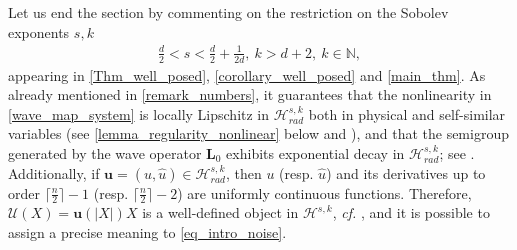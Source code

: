 \documentclass[12pt,reqno]{amsart}
\theoremstyle{plain}
\theoremstyle{remark}
\theoremstyle{plain}
\theoremstyle{definition}
\numberwithin{equation}{section}
\numberwithin{equation}{section}
\def\N{{\mathbb N}}
\newcommand{\HH}{\mathcal{H}}
\begin{document}
	Let us end the section by commenting on the restriction on the Sobolev exponents $s,k$ 
	\begin{align*}
		\frac{d}{2}<s<\frac{d}{2}+\frac{1}{2d},\ k>d+2,\ k\in \N,
	\end{align*}
	appearing in \autoref{Thm_well_posed}, \autoref{corollary_well_posed} and \autoref{main_thm}. As already mentioned in \autoref{remark_numbers}, it guarantees that the nonlinearity in \eqref{wave_map_system} is locally Lipschitz in $\HH_{rad}^{s,k}$ both in physical and self-similar variables (see \autoref{lemma_regularity_nonlinear} below and \cite[Lemma 7.1]{glogic2025globally}), and that the semigroup generated by the wave operator $\mathbf{L}_0$ exhibits exponential decay in $\HH_{rad}^{s,k}$; see  \cite[Proposition 4.1, Proposition 6.2]{glogic2025globally}. Additionally, if $\mathbf{u}=(u,\hat{u}) \in \HH_{rad}^{s,k}$, then $u$ (resp. $\hat{u}$) and its derivatives up to order $\lceil \tfrac{n}{2} \rceil - 1$ (resp. $\lceil \tfrac{n}{2} \rceil - 2$) are uniformly continuous functions. Therefore, $\boldsymbol{\mathcal{U}}(X) = \mathbf{u}(|X|)X$ is a well-defined object in $\HH^{s,k}$, \emph{cf.} \cite[Proposition A.5, Remark A.6]{glogic2022stable}, and it is possible to assign a precise meaning to \eqref{eq_intro_noise}.
\end{document}
